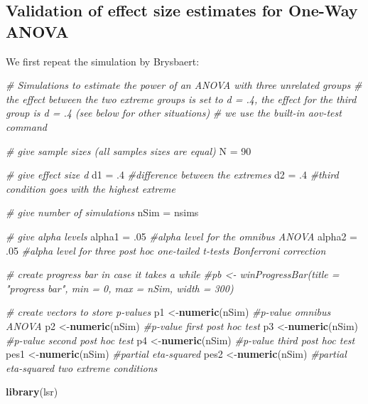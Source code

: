 \documentclass[]{article}
\title{}
\author{}
\date{}
\newenvironment{Shaded}{\begin{snugshade}}{\end{snugshade}}
\newcommand{\KeywordTok}[1]{\textcolor[rgb]{0.13,0.29,0.53}{\textbf{#1}}}
\newcommand{\DecValTok}[1]{\textcolor[rgb]{0.00,0.00,0.81}{#1}}
\newcommand{\FloatTok}[1]{\textcolor[rgb]{0.00,0.00,0.81}{#1}}
\newcommand{\StringTok}[1]{\textcolor[rgb]{0.31,0.60,0.02}{#1}}
\newcommand{\CommentTok}[1]{\textcolor[rgb]{0.56,0.35,0.01}{\textit{#1}}}
\newcommand{\NormalTok}[1]{#1}
\begin{document}
\subsection{Validation of effect size estimates for One-Way
ANOVA}\label{validation-of-effect-size-estimates-for-one-way-anova}

We first repeat the simulation by Brysbaert:

\begin{Shaded}
\begin{Highlighting}[]
\CommentTok{# Simulations to estimate the power of an ANOVA with three unrelated groups}
\CommentTok{# the effect between the two extreme groups is set to d = .4, the effect for the third group is d = .4 (see below for other situations)}
\CommentTok{# we use the built-in aov-test command}

\CommentTok{# give sample sizes (all samples sizes are equal)}
\NormalTok{N =}\StringTok{ }\DecValTok{90}

\CommentTok{# give effect size d}
\NormalTok{d1 =}\StringTok{ }\FloatTok{.4} \CommentTok{#difference between the extremes}
\NormalTok{d2 =}\StringTok{ }\FloatTok{.4} \CommentTok{#third condition goes with the highest extreme}

\CommentTok{# give number of simulations}
\NormalTok{nSim =}\StringTok{ }\NormalTok{nsims}

\CommentTok{# give alpha levels}
\NormalTok{alpha1 =}\StringTok{ }\FloatTok{.05} \CommentTok{#alpha level for the omnibus ANOVA}
\NormalTok{alpha2 =}\StringTok{ }\FloatTok{.05} \CommentTok{#alpha level for three post hoc one-tailed t-tests Bonferroni correction}

\CommentTok{# create progress bar in case it takes a while}
\CommentTok{#pb <- winProgressBar(title = "progress bar", min = 0, max = nSim, width = 300)}

\CommentTok{# create vectors to store p-values}
\NormalTok{p1 <-}\KeywordTok{numeric}\NormalTok{(nSim) }\CommentTok{#p-value omnibus ANOVA}
\NormalTok{p2 <-}\KeywordTok{numeric}\NormalTok{(nSim) }\CommentTok{#p-value first post hoc test}
\NormalTok{p3 <-}\KeywordTok{numeric}\NormalTok{(nSim) }\CommentTok{#p-value second post hoc test}
\NormalTok{p4 <-}\KeywordTok{numeric}\NormalTok{(nSim) }\CommentTok{#p-value third post hoc test}
\NormalTok{pes1 <-}\KeywordTok{numeric}\NormalTok{(nSim) }\CommentTok{#partial eta-squared}
\NormalTok{pes2 <-}\KeywordTok{numeric}\NormalTok{(nSim) }\CommentTok{#partial eta-squared two extreme conditions}


\KeywordTok{library}\NormalTok{(lsr)}


\end{Highlighting}
\end{Shaded}
\end{document}
